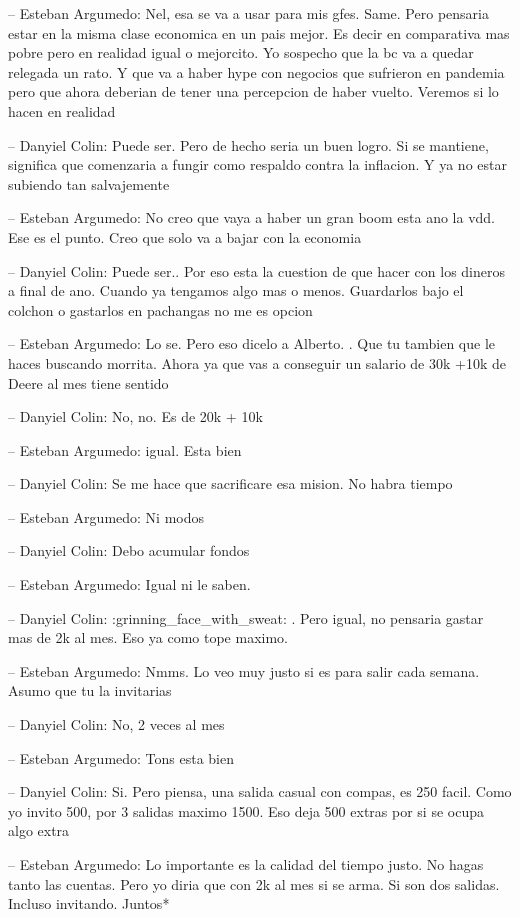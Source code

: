 -- Esteban Argumedo: Nel, esa se va a usar para mis gfes. Same. Pero
pensaria estar en la misma clase economica en un pais mejor. Es decir en
comparativa mas pobre pero en realidad igual o mejorcito. Yo sospecho
que la bc va a quedar relegada un rato. Y que va a haber hype con
negocios que sufrieron en pandemia pero que ahora deberian de tener una
percepcion de haber vuelto. Veremos si lo hacen en realidad

-- Danyiel Colin: Puede ser. Pero de hecho seria un buen logro. Si se
mantiene, significa que comenzaria a fungir como respaldo contra la
inflacion. Y ya no estar subiendo tan salvajemente

-- Esteban Argumedo: No creo que vaya a haber un gran boom esta ano la
vdd. Ese es el punto. Creo que solo va a bajar con la economia

-- Danyiel Colin: Puede ser.. Por eso esta la cuestion de que hacer con
los dineros a final de ano. Cuando ya tengamos algo mas o menos.
Guardarlos bajo el colchon o gastarlos en pachangas no me es opcion

-- Esteban Argumedo: Lo se. Pero eso dicelo a Alberto. . Que tu tambien
que le haces buscando morrita. Ahora ya que vas a conseguir un salario
de 30k +10k de Deere al mes tiene sentido

-- Danyiel Colin: No, no. Es de 20k + 10k

-- Esteban Argumedo: igual. Esta bien

-- Danyiel Colin: Se me hace que sacrificare esa mision. No habra tiempo

-- Esteban Argumedo: Ni modos

-- Danyiel Colin: Debo acumular fondos

-- Esteban Argumedo: Igual ni le saben.

-- Danyiel Colin: :grinning\_face\_with\_sweat: . Pero igual, no
pensaria gastar mas de 2k al mes. Eso ya como tope maximo.

-- Esteban Argumedo: Nmms. Lo veo muy justo si es para salir cada
semana. Asumo que tu la invitarias

-- Danyiel Colin: No, 2 veces al mes

-- Esteban Argumedo: Tons esta bien

-- Danyiel Colin: Si. Pero piensa, una salida casual con compas, es 250
facil. Como yo invito 500, por 3 salidas maximo 1500. Eso deja 500
extras por si se ocupa algo extra

-- Esteban Argumedo: Lo importante es la calidad del tiempo justo. No
hagas tanto las cuentas. Pero yo diria que con 2k al mes si se arma. Si
son dos salidas. Incluso invitando. Juntos*

